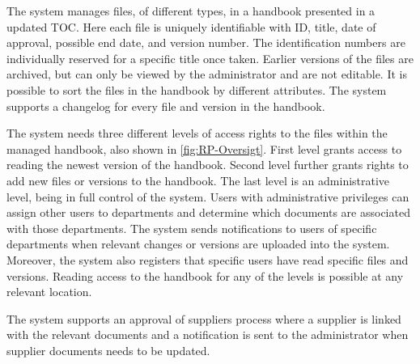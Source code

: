 The system manages files, of different types, in a handbook presented in a updated TOC.
Here each file is uniquely identifiable with ID, title, date of approval, possible end date, and version number.
The identification numbers are individually reserved for a specific title once taken.
Earlier versions of the files are archived, but can only be viewed by the administrator and are not editable.
It is possible to sort the files in the handbook by different attributes.
The system supports a changelog for every file and version in the handbook.

The system needs three different levels of access rights to the files within the managed handbook, also shown in \cref{fig:RP-Oversigt}.
First level grants access to reading the newest version of the handbook.
Second level further grants rights to add new files or versions to the handbook.
The last level is an administrative level, being in full control of the system.
Users with administrative privileges can assign other users to departments and determine which documents are associated with those departments.
The system sends notifications to users of specific departments when relevant changes or versions are uploaded into the system.
Moreover, the system also registers that specific users have read specific files and versions.
Reading access to the handbook for any of the levels is possible at any relevant location.

The system supports an approval of suppliers process where a supplier is linked with the relevant documents and a notification is sent to the administrator when supplier documents needs to be updated.
